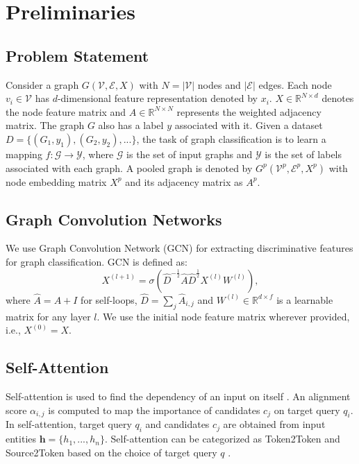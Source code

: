\documentclass[letterpaper]{article} \usepackage{aaai20}  \usepackage{times}  \usepackage{helvet} \usepackage{courier}  \usepackage[hyphens]{url}  \usepackage{graphicx} \urlstyle{rm} \def\UrlFont{\rm}  \usepackage{graphicx}  \frenchspacing  \setlength{\pdfpagewidth}{8.5in}  \setlength{\pdfpageheight}{11in}
\begin{document}
%
 


\section{Preliminaries}
\subsection{Problem Statement}
Consider a graph $G(\mathcal{V}, \mathcal{E}, X)$ with $N = |\mathcal{V}|$ nodes and $|\mathcal{E}|$ edges. Each node $v_{i} \in \mathcal{V}$ has $d$-dimensional feature representation denoted by $x_i$. $X \in \mathbb{R}^{N \times d}$ denotes the node feature matrix and $A \in \mathbb{R}^{N \times N}$ represents the weighted adjacency matrix. The graph $G$ also has a label $y$ associated with it. Given a dataset $D = \{(G_{1}, y_{1}),(G_{2}, y_{2}),...\}$, the task of graph classification is to learn a mapping $f:\mathcal{G} \rightarrow \mathcal{Y}$, where $\mathcal{G}$ is the set of input graphs and $\mathcal{Y}$ is the set of labels associated with each graph. A pooled graph is denoted by $G^{p}(\mathcal{V}^{p}, \mathcal{E}^{p}, X^p)$ with node embedding matrix $X^{p}$ and its adjacency matrix as $A^{p}$.


\subsection{Graph Convolution Networks} We use Graph Convolution Network (GCN) \cite{gcn} for extracting discriminative features for graph classification. GCN is defined as:
\begin{equation}
\label{eq:gcn}
    X^{(l+1)} = \sigma(\hat{D}^{-\frac{1}{2}} \hat{A} \hat{D}^{\frac{1}{2}} X^{(l)} W^{(l)}),
\end{equation}
where $\hat{A} = A + I$ for self-loops, $\hat{D} = \sum_{j}\hat{A}_{i,j}$ and $W^{(l)} \in \mathbb{R}^{d \times f}$ is a learnable matrix for any layer $l$. We use the initial node feature matrix wherever provided, i.e., $X^{(0)} = X$.










\subsection{Self-Attention}
\label{sec:self_attn}
Self-attention is used to find the dependency of an input on itself \cite{SA-cheng,vaswani}. An alignment score $\alpha_{i,j}$ is computed to map the importance of candidates $c_{j}$ on target query $q_{i}$. In self-attention, target query $q_{i}$ and candidates $c_{j}$ are obtained from input entities $\boldsymbol{h}=\{h_{1},...,h_{n}\}$. Self-attention can be categorized as Token2Token and Source2Token based on the choice of target query $q$ \cite{disan}.
\end{document}
